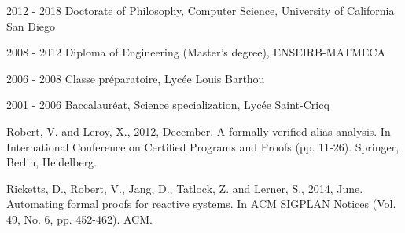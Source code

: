 \documentclass[12pt]{ucsddissertation}
\begin{document}
\begin{vita}
\noindent
\begin{cv}{}
\begin{cvlist}{}
\item[2012 - 2018] Doctorate of Philosophy, Computer Science, University of California San Diego
\item[2008 - 2012] Diploma of Engineering (Master's degree), ENSEIRB-MATMECA
\item[2006 - 2008] Classe pr\'eparatoire, Lyc\'ee Louis Barthou
\item[2001 - 2006] Baccalaur\'eat, Science specialization, Lyc\'ee Saint-Cricq
\end{cvlist}
\end{cv}

\publications

\noindent Robert, V. and Leroy, X., 2012, December. A formally-verified alias
analysis. In International Conference on Certified Programs and Proofs
(pp. 11-26). Springer, Berlin, Heidelberg.

\noindent Ricketts, D., Robert, V., Jang, D., Tatlock, Z. and Lerner, S., 2014,
June. Automating formal proofs for reactive systems. In ACM SIGPLAN Notices
(Vol. 49, No. 6, pp. 452-462). ACM.

\end{vita}
\end{document}
